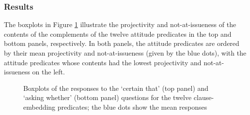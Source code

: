 \documentclass[11pt,fleqn]{article}
\newcommand{\6}{\mbox{$[\hspace*{-.6mm}[$}}
\newcommand{\9}{\mbox{$]\hspace*{-.6mm}]$}}
\begin{document}
\subsubsection{Results}

The boxplots in Figure \ref{f-exp1b} illustrate the projectivity and not-at-issueness of the contents of the complements of the twelve attitude predicates in the top and bottom panels, respectively. In both panels, the attitude predicates are ordered by their mean projectivity and not-at-issueness (given by the blue dots), with the attitude predicates whose contents had the lowest projectivity and not-at-issueness on the left. 

\begin{figure}[!h]

\begin{center}

\end{center}

\caption{Boxplots of the responses to the `certain that' (top panel) and `asking whether' (bottom panel) questions for the twelve clause-embedding predicates; the blue dots show the mean responses}\label{f-exp1b}
\end{figure}
\end{document}
